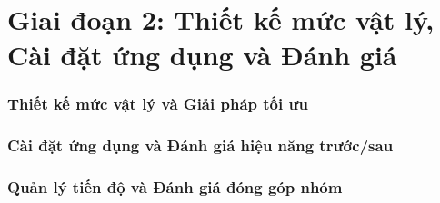 \documentclass[11pt, a4paper]{article}
\begin{document}
\newpage
\part*{Giai đoạn 2: Thiết kế mức vật lý, Cài đặt ứng dụng và Đánh giá}

\section{Thiết kế mức vật lý và Giải pháp tối ưu}









\section{Cài đặt ứng dụng và Đánh giá hiệu năng trước/sau}



\section{Quản lý tiến độ và Đánh giá đóng góp nhóm}


\end{document}

